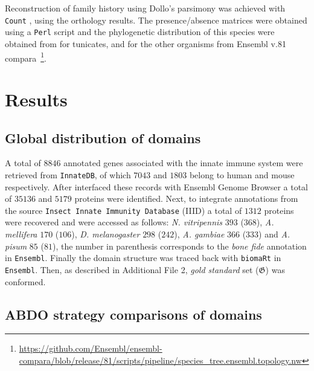 \documentclass[11pt]{article}
\begin{document}
Reconstruction of family history using Dollo's parsimony was 
achieved with \texttt{Count} \cite{csuros2010}, using the orthology 
results. The presence/absence matrices were obtained using a \texttt{Perl} script 
and the phylogenetic distribution of this species were obtained from 
\cite{Delsuc:2017, Kocot:2018} for tunicates, and for the other organisms from 
Ensembl v.81 compara~\footnote{\url{https://github.com/Ensembl/ensembl-compara/blob/release/81/scripts/pipeline/species_tree.ensembl.topology.nw}}.

\section*{Results}

\subsection*{Global distribution of domains}

A total of $8846$ annotated genes associated with the innate immune system were retrieved 
from \texttt{InnateDB}, of which $7043$ and $1803$ belong to human and mouse 
respectively. After interfaced these records with Ensembl Genome Browser a total 
of $35136$ and $5179$ proteins were identified. Next, to integrate annotations from
the source \texttt{Insect Innate Immunity Database} (IIID) a total of $1312$ proteins were
recovered and were accessed as follows: \textsl{N. vitripennis} $393$ ($368$), 
\textsl{A. mellifera} $170$ ($106$), \textsl{D. melanogaster} $298$ ($242$), \textsl{A. gambiae}
$366$ ($333$) and \textsl{A. pisum} $85$ ($81$), the number in parenthesis corresponds to 
the \textsl{bone fide} annotation in \texttt{Ensembl}. Finally the domain structure was 
traced back with \texttt{biomaRt} in \texttt{Ensembl}. Then, as described in Additional 
File 2, \textsl{gold standard} set ($\boldsymbol{\mathfrak{G}}$) was conformed.

\subsection*{\textbf{ABDO} strategy comparisons of domains}\label{subODB}
\end{document}
